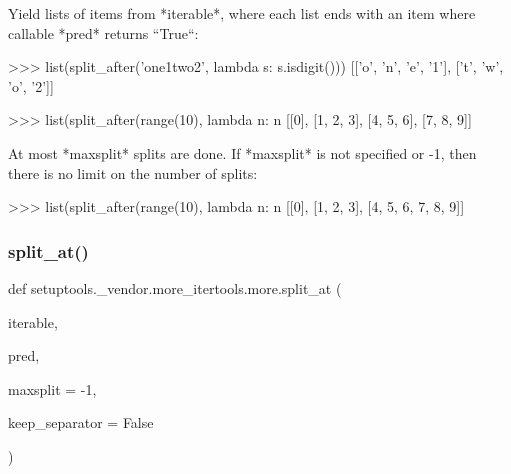 \begin{DoxyVerb}Yield lists of items from *iterable*, where each list ends with an
item where callable *pred* returns ``True``:

    >>> list(split_after('one1two2', lambda s: s.isdigit()))
    [['o', 'n', 'e', '1'], ['t', 'w', 'o', '2']]

    >>> list(split_after(range(10), lambda n: n %
    [[0], [1, 2, 3], [4, 5, 6], [7, 8, 9]]

At most *maxsplit* splits are done. If *maxsplit* is not specified or -1,
then there is no limit on the number of splits:

    >>> list(split_after(range(10), lambda n: n %
    [[0], [1, 2, 3], [4, 5, 6, 7, 8, 9]]\end{DoxyVerb}
 \mbox{\label{namespacesetuptools_1_1__vendor_1_1more__itertools_1_1more_a48991f9b47c87b9b92f472299ce47f99}} 
\subsubsection{\texorpdfstring{split\+\_\+at()}{split\_at()}}
{\footnotesize\ttfamily def setuptools.\+\_\+vendor.\+more\+\_\+itertools.\+more.\+split\+\_\+at (\begin{DoxyParamCaption}\item[{}]{iterable,  }\item[{}]{pred,  }\item[{}]{maxsplit = {\ttfamily -\/1},  }\item[{}]{keep\+\_\+separator = {\ttfamily False} }\end{DoxyParamCaption})}


